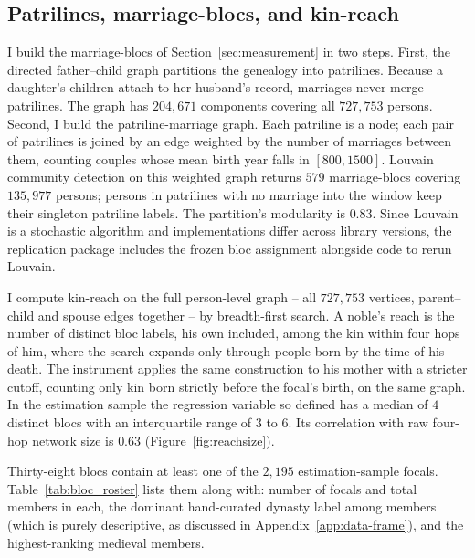 \documentclass[12pt]{article}
\theoremstyle{definition}
\theoremstyle{remark}
\begin{document}
\subsection{Patrilines, marriage-blocs, and kin-reach}
\label{app:data-blocs}

I build the marriage-blocs of Section~\ref{sec:measurement} in two steps. First, the directed father--child graph partitions the genealogy into patrilines. Because a daughter's children attach to her husband's record, marriages never merge patrilines. The graph has $204{,}671$ components covering all $727{,}753$ persons. Second, I build the patriline-marriage graph. Each patriline is a node; each pair of patrilines is joined by an edge weighted by the number of marriages between them, counting couples whose mean birth year falls in $[800,1500]$. Louvain community detection on this weighted graph returns $579$ marriage-blocs covering $135{,}977$ persons; persons in patrilines with no marriage into the window keep their singleton patriline labels. The partition's modularity is $0.83$. Since Louvain is a stochastic algorithm and implementations differ across library versions, the replication package includes the frozen bloc assignment alongside code to rerun Louvain.

I compute kin-reach on the full person-level graph -- all $727{,}753$ vertices, parent--child and spouse edges together -- by breadth-first search. A noble's reach is the number of distinct bloc labels, his own included, among the kin within four hops of him, where the search expands only through people born by the time of his death. The instrument applies the same construction to his mother with a stricter cutoff, counting only kin born strictly before the focal's birth, on the same graph. In the estimation sample the regression variable so defined has a median of $4$ distinct blocs with an interquartile range of $3$ to $6$. Its correlation with raw four-hop network size is $0.63$ (Figure~\ref{fig:reachsize}).

Thirty-eight blocs contain at least one of the $2{,}195$ estimation-sample focals. Table~\ref{tab:bloc_roster} lists them along with: number of focals and total members in each, the dominant hand-curated dynasty label among members (which is purely descriptive, as discussed in Appendix~\ref{app:data-frame}), and the highest-ranking medieval members.
\end{document}
